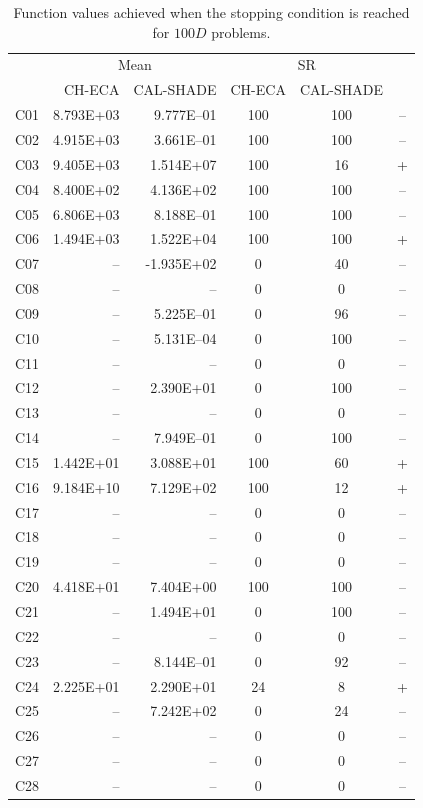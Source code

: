 \documentclass[conference]{IEEEtran}
\begin{document}
% 
% 
% 
\begin{table}[!ht]
	\caption{Function values achieved when the stopping condition is reached for $100D$ problems.}
	\centering
	\begin{tabular}{|c|r|r|c|c|c|}
	 \hline
	 &\multicolumn{2}{|c|}{Mean} & \multicolumn{2}{|c|}{SR} & \\
	\cline{2-5}
	 & CH-ECA & CAL-SHADE & CH-ECA & CAL-SHADE & \\ \hline

C01 & 8.793E+03 & 9.777E--01 &  100 &  100 & -- \\ 
C02 & 4.915E+03 & 3.661E--01 &  100 &  100 & -- \\ 
C03 & 9.405E+03 & 1.514E+07 &  100 &   16 & + \\ 
C04 & 8.400E+02 & 4.136E+02 &  100 &  100 & -- \\ 
C05 & 6.806E+03 & 8.188E--01 &  100 &  100 & -- \\ 
C06 & 1.494E+03 & 1.522E+04 &  100 &  100 & + \\ 
C07 &  -- & -1.935E+02 &    0 &   40 & -- \\ 
C08 &  -- &  -- &    0 &    0 & -- \\ 
C09 &  -- & 5.225E--01 &    0 &   96 & -- \\ 
C10 &  -- & 5.131E--04 &    0 &  100 & -- \\ 
C11 &  -- &  -- &    0 &    0 & -- \\ 
C12 &  -- & 2.390E+01 &    0 &  100 & -- \\ 
C13 &  -- &  -- &    0 &    0 & -- \\ 
C14 &  -- & 7.949E--01 &    0 &  100 & -- \\ 
C15 & 1.442E+01 & 3.088E+01 &  100 &   60 & + \\ 
C16 & 9.184E+10 & 7.129E+02 &  100 &   12 & + \\ 
C17 &  -- &  -- &    0 &    0 & -- \\ 
C18 &  -- &  -- &    0 &    0 & -- \\ 
C19 &  -- &  -- &    0 &    0 & -- \\ 
C20 & 4.418E+01 & 7.404E+00 &  100 &  100 & -- \\ 
C21 &  -- & 1.494E+01 &    0 &  100 & -- \\ 
C22 &  -- &  -- &    0 &    0 & -- \\ 
C23 &  -- & 8.144E--01 &    0 &   92 & -- \\ 
C24 & 2.225E+01 & 2.290E+01 &   24 &    8 & + \\ 
C25 &  -- & 7.242E+02 &    0 &   24 & -- \\ 
C26 &  -- &  -- &    0 &    0 & -- \\ 
C27 &  -- &  -- &    0 &    0 & -- \\ 
C28 &  -- &  -- &    0 &    0 & -- \\ 
   \hline
	\end{tabular}
	\label{tab:d100c}
\end{table}


\end{document}
